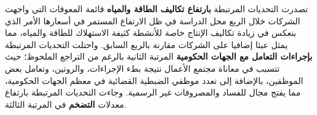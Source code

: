 تصدرت التحديات المرتبطة \textbf{بارتفاع تكاليف الطاقة والمياه} قائمة المعوقات التي واجهت الشركات خلال الربع محل الدراسة في ظل الارتفاع المستمر في أسعارها الأمر الذي ينعكس في زيادة تكاليف الإنتاج خاصة للأنشطة كثيفة الاستهلاك للطاقة والمياه، مما يمثل عبئا إضافيا على الشركات مقارنة بالربع السابق. واحتلت التحديات المرتبطة \textbf{بإجراءات التعامل مع الجهات الحكومية} المرتبة الثانية بالرغم من التراجع الملحوظ؛ حيث تتسبب في معاناة مجتمع الأعمال نتيجة بطء الإجراءات، والروتين، وتعامل بعض الموظفين، بالإضافة إلى تعدد موظفي الضبطية القضائية في معظم الجهات الحكومية، مما يفتح مجال للفساد والمصروفات غير الرسمية. وجاءت التحديات المرتبطة بارتفاع معدلات \textbf{التضخم} في المرتبة الثالثة.
